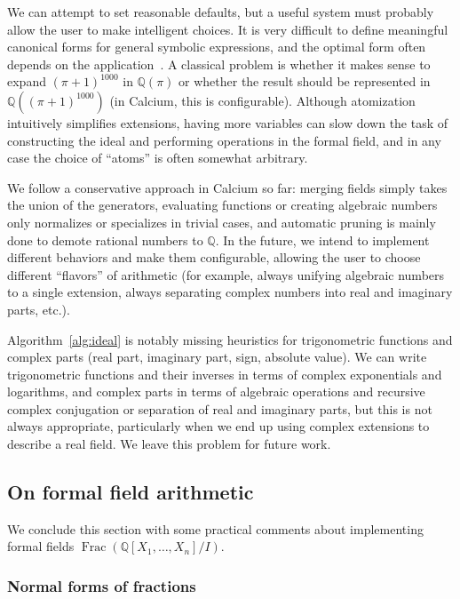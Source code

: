 \documentclass[sigconf,screen,urlbreakonhyphens]{acmart}
\begin{document}
We can attempt to set reasonable defaults, but a useful system
must probably allow the user to make intelligent choices.
It is very difficult to define meaningful canonical forms for general
symbolic expressions, and the optimal
form often depends on the application~\cite{Mos1971,Car2004}.
A classical problem is whether it makes sense to expand $(\pi+1)^{1000}$ in $\mathbb{Q}(\pi)$
or whether the result should be represented in $\mathbb{Q}((\pi+1)^{1000})$
(in Calcium, this is configurable).
Although atomization intuitively simplifies extensions,
having more variables
can slow down the task of constructing
the ideal and performing operations in the formal field,
and in any case the choice of ``atoms'' is often somewhat arbitrary.

We follow a conservative approach in Calcium so far: merging fields simply
takes the union of the generators,
evaluating functions or creating algebraic numbers
only normalizes or specializes in trivial cases,
and automatic pruning is mainly done to demote rational numbers
to $\mathbb{Q}$. In the future, we intend to implement different
behaviors and make them configurable, allowing the user to choose different
``flavors'' of arithmetic (for example, always unifying algebraic numbers to
a single extension, always separating complex numbers into
real and imaginary parts, etc.).

Algorithm~\ref{alg:ideal} 
is notably missing heuristics for
trigonometric functions
and complex parts (real part, imaginary part, sign,
absolute value).
We can write trigonometric functions and their inverses
in terms of complex exponentials and logarithms,
and complex parts in terms of algebraic operations
and recursive complex conjugation or separation of real
and imaginary parts,
but this is not always appropriate, particularly when we end up using
complex extensions to describe a real field.
We leave this problem for future work.

\subsection{On formal field arithmetic}

We conclude this section with
some practical comments
about implementing formal fields
$\operatorname{Frac}(\mathbb{Q}[X_1,\ldots,X_n] / I)$.

\subsubsection{Normal forms of fractions}
\end{document}
